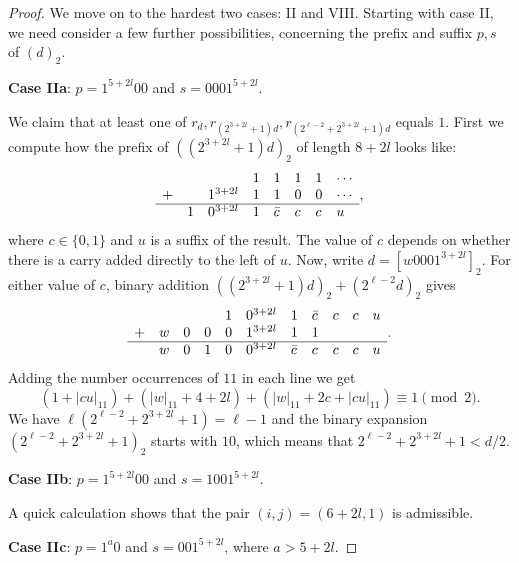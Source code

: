 \documentclass[a4paper,11pt]{amsart}
\theoremstyle{definition}
\begin{document}
\begin{proof}
We move on to the hardest two cases:  II and VIII. Starting with case II, we need consider a few further possibilities, concerning the prefix and suffix $p,s$ of $(d)_2$.

\textbf{Case IIa}: $p = 1^{5+2l}00$ and $s=0001^{5+2l}$.

We claim that at least one of $r_{d}, r_{(2^{3+2l}+1)d}, r_{(2^{\ell-2}+2^{3+2l}+1)d}$ equals $1$. First we compute how the prefix of $((2^{3+2l}+1)d)_2$ of length $8+2l$ looks like:
$$\begin{array}{llllllll}
       &   &         & 1 & 1       & 1 & 1 & \cdots \\
+      &   & 1^{3+2l} & 1 & 1       & 0 & 0 & \cdots  \\
\hline & 1 & 0^{3+2l} & 1 & \bar{c} & c & c & u      
\end{array},$$
where $c \in \{0,1\}$ and $u$ is a suffix of the result. The value of $c$ depends on whether there is a carry added directly to the left of $u$. Now,  write $d = [w0001^{3+2l}]_2$. For either value of $c$, binary addition $((2^{3+2l}+1)d)_2 + (2^{\ell-2}d)_2$ gives
$$\begin{array}{lllllllllll}
       &   &   &   & 1 & 0^{3+2l} & 1       & \bar{c} & c & c & u \\
+      & w & 0 & 0 & 0 & 1^{3+2l} & 1       & 1       &   &   &   \\
\hline & w & 0 & 1 & 0 & 0^{3+2l} & \bar{c} & c       & c & c & u
\end{array}.$$
Adding the number occurrences of $11$ in each line we get
$$  (1 + |cu|_{11}) + (|w|_{11} + 4+2l) +  (|w|_{11} + 2c + |cu|_{11}) \equiv 1 \pmod{2}.$$ We have $\ell(2^{\ell-2}+ 2^{3+2l}+1) = \ell-1$ and the binary expansion $(2^{\ell-2}+ 2^{3+2l}+1)_2$ starts with $10$, which means that $2^{\ell-2}+ 2^{3+2l}+1 < d/2$.

\textbf{Case IIb}: $p = 1^{5+2l}00$ and $s=1001^{5+2l}$.

A quick calculation shows that the pair $(i,j) = (6+2l,1)$ is admissible.

\textbf{Case IIc}: $p = 1^{a}0$ and $s=001^{5+2l}$, where $a > 5+2l$.


\end{proof}
\end{document}
